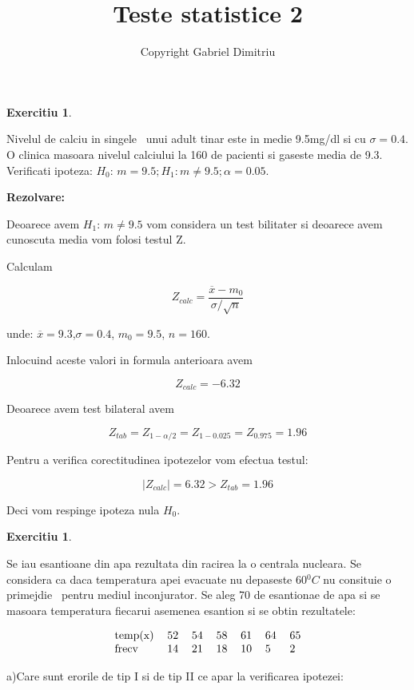 \documentclass{article}
\newtheorem{exercise}[theorem]{Exercitiu}
\begin{document}
\title{Teste statistice 2}
\author{Copyright Gabriel Dimitriu}
\maketitle

\begin{exercise}
\bigskip 
\end{exercise}

Nivelul de calciu in singele \ unui adult tinar este in medie 9.5mg/dl si cu 
$\sigma =0.4$. O clinica masoara nivelul calciului la 160 de pacienti si
gaseste media de 9.3. Verificati ipoteza: $H_{0}:\,m=9.5;H_{1}:m\neq
9.5;\alpha =0.05$.

\textbf{Rezolvare:}

Deoarece avem $H_{1}:\,m\neq 9.5$ vom considera un test bilitater si
deoarece avem cunoscuta media vom folosi testul Z.

Calculam

\[
Z_{calc}=\frac{\overline{x}-m_{0}}{\sigma /\sqrt{n}} 
\]

unde: $\overline{x}=9.3$,$\sigma =0.4$, $m_{0}=9.5$, $n=160$.

Inlocuind aceste valori in formula anterioara avem

\[
Z_{calc}=-6.32 
\]

Deoarece avem test bilateral avem

\[
Z_{tab}=Z_{1-\alpha /2}=Z_{1-0.025}=Z_{0.975}=1.96 
\]

Pentru a verifica corectitudinea ipotezelor vom efectua testul:

\[
\left\vert Z_{calc}\right\vert =6.32>Z_{tab}=1.96 
\]

Deci vom respinge ipoteza nula $H_{0}$.

\begin{exercise}
\end{exercise}

Se iau esantioane din apa rezultata din racirea la o centrala nucleara. Se
considera ca daca temperatura apei evacuate nu depaseste 60$^{0}C$ nu
consituie o primejdie \ pentru mediul inconjurator. Se aleg 70 de esantionae
de apa si se masoara temperatura fiecarui asemenea esantion si se obtin
rezultatele:

\[
\begin{tabular}{lllllll}
temp(x) & 52 & 54 & 58 & 61 & 64 & 65 \\ 
frecv & 14 & 21 & 18 & 10 & 5 & 2%
\end{tabular}%
\]

a)Care sunt erorile de tip I si de tip II ce apar la verificarea ipotezei:
\end{document}
